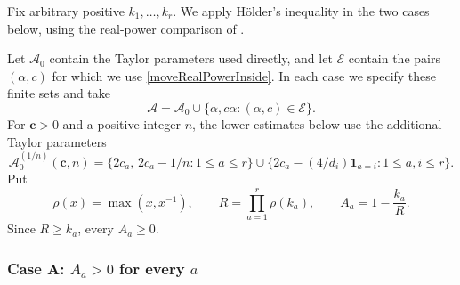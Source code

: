 \documentclass[oneside, 12pt]{amsart}
\theoremstyle{definition}
\begin{document}
{		Fix arbitrary positive $k_1,\ldots,k_r$.  We apply Hölder's
		inequality in the two cases below, using the real-power comparison
		of . 
		
		Let $\mathscr A_0$ contain the Taylor parameters used directly, and let
		$\mathscr E$ contain the pairs $(\alpha,c)$ for which we use
		\eqref{moveRealPowerInside}.  In each case we specify these finite sets
		and take
		\[
		\mathscr A=\mathscr A_0\cup\{\alpha,c\alpha:(\alpha,c)\in\mathscr E\}.
		\]
		For $\boldsymbol c>0$ and a positive integer $n$, the lower estimates
		below use the additional Taylor parameters
		\begin{equation}\label{oneOverNFiniteParameterSet}
			\mathscr A_0^{(1/n)}(\boldsymbol c,n)
			=\{2c_a,\,2c_a-1/n:1\leq a\leq r\}
			\cup\{2c_a-(4/d_i)\mathbf1_{a=i}:1\leq a,i\leq r\}.
		\end{equation}
		Put
		\[
		\rho(x)=\max(x,x^{-1}),\qquad
		R=\prod_{a=1}^r\rho(k_a),\qquad
		A_a=1-\frac{k_a}{R}.
		\]
		Since $R\geq k_a$, every $A_a\geq0$.
		\subsubsection*{Case A: $A_a>0$ for every $a$}
		
}
\end{document}
